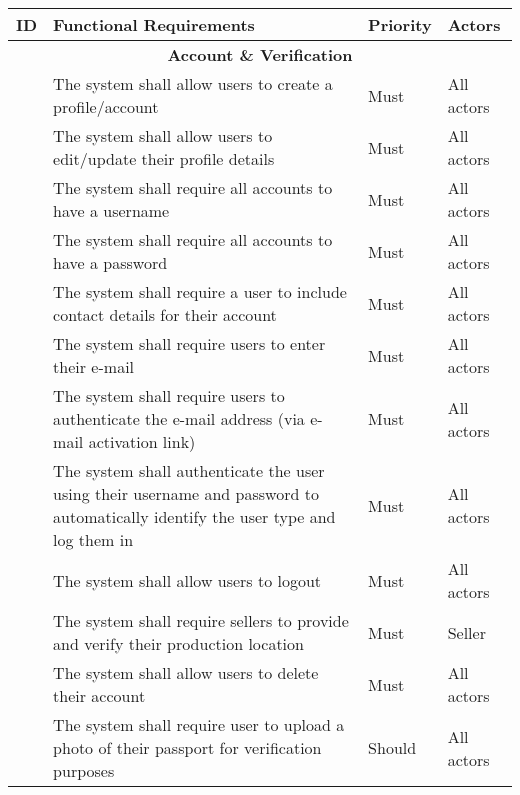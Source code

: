\newcommand\rownumber{\stepcounter{magicrownumbers}\arabic{magicrownumbers}}
{
\footnotesize
\begin{longtable}{|p{0.5cm}|p{10cm}p{1.3cm}p{1.7cm}|}

\rowcolor[HTML]{000000}
{\color[HTML]{FFFFFF} \textbf{ID}} & {\color[HTML]{FFFFFF} \textbf{Functional Requirements}}  & {\color[HTML]{FFFFFF} \textbf{Priority}} & {\color[HTML]{FFFFFF}  \textbf{Actors}  } \\ \hline \endhead
\multicolumn{4}{|c|}{\textbf{Account \& Verification}} \\ \hline
\rownumber & The system shall allow users to create a profile/account &Must & \multicolumn{1}{l|}{All actors} \\ \hline
\rownumber & The system shall allow users to edit/update their profile details& Must & \multicolumn{1}{l|}{All actors} \\ \hline
\rownumber & The system shall require all accounts to have a username &Must & \multicolumn{1}{l|}{All actors} \\ \hline
\rownumber & The system shall require all accounts to have a password &Must & \multicolumn{1}{l|}{All actors} \\ \hline
\rownumber & The system shall require a user to include contact details for their account &Must& \multicolumn{1}{l|}{All actors} \\ \hline
\rownumber & The system shall require users to enter their e-mail &Must  & \multicolumn{1}{l|}{All actors} \\ \hline
\rownumber & The system shall require users to authenticate the e-mail address (via e-mail activation link) &Must  & \multicolumn{1}{l|}{All actors} \\ \hline
\rownumber & The system shall authenticate the user using their username and password to automatically identify the user type and log them in &Must  & \multicolumn{1}{l|}{All actors} \\ \hline
\rownumber & The system shall allow users to logout& Must  & \multicolumn{1}{l|}{All actors} \\ \hline
\rownumber & The system shall require sellers to provide and verify their production location & Must  & \multicolumn{1}{l|}{Seller} \\ \hline
\rownumber & The system shall allow users to delete their account &Must  & \multicolumn{1}{l|}{All actors} \\ \hline
\rownumber & The system shall require user to upload a photo of their passport for verification purposes &Should  & \multicolumn{1}{l|}{All actors} \\ \hline

\end{longtable}}
